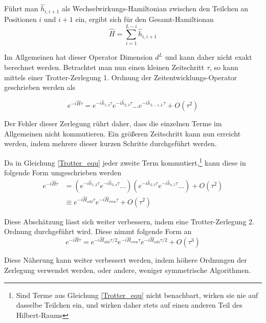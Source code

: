\documentclass[10pt,a4paper]{report}
\begin{document}
Führt man $\hat{h}_{i,i+1}$ als Wechselwirkungs-Hamiltonian zwischen den Teilchen an Positionen $i$ und $i+1$ ein, ergibt sich für den Gesamt-Hamiltionan
\begin{equation}
\hat{H}=\sum_{i=1}^{L-i}\hat{h}_{i,i+1}
\end{equation}

Im Allgemeinen hat dieser Operator Dimension $d^L$ und kann daher nicht exakt berechnet werden. Betrachtet man nun einen kleinen Zeitschritt $\tau$, so kann mittels einer Trotter-Zerlegung 1. Ordnung der Zeitentwicklungs-Operator geschrieben werden als

\begin{equation}\label{Trotter_equ}
e^{-i\hat{H}\tau}= e^{-i\hat{h}_{1,2}\tau}e^{-i\hat{h}_{2,3}\tau}\ldots e^{-i\hat{h}_{L-1,L}\tau}+O(\tau^2)
\end{equation}

Der Fehler dieser Zerlegung rührt daher, dass die einzelnen Terme im Allgemeinen nicht kommutieren. Ein größeren Zeitschritt kann nun erreicht werden, indem mehrere dieser kurzen Schritte durchgeführt werden.

Da in Gleichung \ref{Trotter_equ} jeder zweite Term kommutiert,\footnote{Sind Terme aus Gleichung \ref{Trotter_equ} nicht benachbart, wirken sie nie auf dasselbe Teilchen ein, und wirken daher stets auf einen anderen Teil des Hilbert-Raums} kann diese in folgende Form umgeschrieben werden
\begin{equation}
\begin{split}
e^{-i\hat{H}\tau}&=(e^{-i\hat{h}_{1,2}\tau}e^{-i\hat{h}_{3,4}\tau}\ldots)(e^{-i\hat{h}_{2,3}\tau}e^{-i\hat{h}_{4,5}\tau}\ldots)+O(\tau^2)\\
&\equiv e^{-i\hat{H}_{\text{odd}}\tau}e^{-i\hat{H}_{\text{even}}\tau}+O(\tau^2)
\end{split}
\end{equation}

Diese Abschätzung lässt sich weiter verbessern, indem eine Trotter-Zerlegung 2. Ordnung durchgeführt wird. Diese nimmt folgende Form an
\begin{equation}
e^{-i\hat{H}\tau}=e^{-i\hat{H}_{\text{odd}}\tau/2}e^{-i\hat{H}_{\text{even}}\tau}e^{-i\hat{H}_{\text{odd}}\tau/2}+O(\tau^3)
\end{equation}

Diese Näherung kann weiter verbessert werden, indem höhere Ordnungen der Zerlegung verwendet werden, oder andere, weniger symmetrische Algorithmen.
\end{document}
